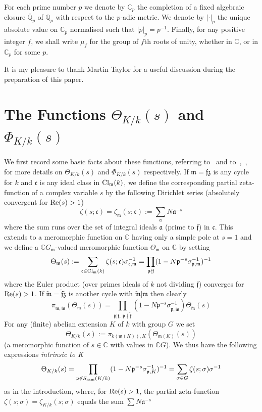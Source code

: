 \documentclass[12pt]{article}
\newcounter{rem}[section]%
\newcommand{\barbbQ}{\ensuremath{\bar{\bbQ}}}
\newcommand{\bbC}{\ensuremath{\mathbb{C}}}
\newcommand{\bbQ}{\ensuremath{\mathbb{Q}}}
\newcommand{\beql}[1]{\begin{equation}\label{#1}}
\newcommand{\Cl}{{\rm Cl}}
\newcommand{\eeq}{\end{equation}}
\newcommand{\fa}{\ensuremath{\mathfrak{a}}}
\newcommand{\fc}{\ensuremath{\mathfrak{c}}}
\newcommand{\ff}{\ensuremath{\mathfrak{f}}}
\newcommand{\fm}{\ensuremath{\mathfrak{m}}}
\newcommand{\fp}{\ensuremath{\mathfrak{p}}}
\newcommand{\fz}{\ensuremath{\mathfrak{z}}}
\newcommand{\inv}{^{-1}}%
\newcommand{\ndiv}{\nmid}
\newcommand{\nin}{\not\in}
\newcommand{\rem}{\refstepcounter{rem}\noindent{\sc Remark \therem}}%
\renewcommand{\therem}{\thesection.\arabic{rem}}
\newcommand{\Clmk}{\ensuremath{\Cl_\fm(k)}}
\newcommand{\tff}{\ensuremath{\tilde{\ff}}}
\newcommand{\tfm}{\ensuremath{{\tilde{\fm}}}}
\begin{document}
For each prime number $p$ we denote by
$\bbC_p$ the completion of a  fixed algebraic closure $\barbbQ_p$ of $\bbQ_p$
with respect to the $p$-adic metric. We denote by $|\cdot|_p$ the unique absolute value
on $\bbC_p$ normalised such that $|p|_p=p\inv$. Finally, for any positive integer
$f$, we shall write $\mu_f$ for the group of $f$th roots of unity, whether in $\bbC$, or in
$\bbC_p$ for some $p$.

It is my pleasure to thank Martin Taylor for a useful discussion during the
preparation of this paper.

\section{The Functions $\Theta_{K/k}(s)$ and $\Phi_{K/k}(s)$}\label{sec:thetaandphi}
We first record some basic facts about these functions, referring
to~\cite[Ch. IV]{Tate} and to~\cite{twizas},~\cite{zetap1},~\cite{sconzp}
for more details on $\Theta_{K/k}(s)$ and $\Phi_{K/k}(s)$ respectively.
If $\fm=\ff\fz$ is any cycle for $k$ and $\fc$ is any ideal class in $\Clmk$, we
define the corresponding partial zeta-function of a complex variable $s$
by the following Dirichlet series (absolutely convergent for ${\rm Re}(s)>1$)
\[
\zeta(s;\fc)=\zeta_\fm(s;\fc):=\sum_{\fa}N\fa^{-s}
\]
where the sum runs over the set of integral ideals $\fa$
(prime to $\ff$) in $\fc$.
This extends to a meromorphic function on $\bbC$ having only a
simple pole at $s=1$ and we define a $\bbC G_\fm$-valued meromorphic function
$\Theta_\fm$ on $\bbC$ by setting
\beql{eq:2Z}
\Theta_\fm(s):=\sum_{\fc\in\Clmk}\zeta(s;\fc)\sigma_{\fc,\fm}\inv=
\prod_{\fp\ndiv\ff}(1-N\fp^{-s}\sigma_{\fp,\fm}\inv)\inv
\eeq
where the Euler product (over primes ideals of $k$ not dividing $\ff$)
converges for ${\rm Re}(s)>1$.
If $\tilde{\fm}=\tilde{\ff}\tilde{\fz}$ is another cycle with $\tfm|\fm$ then clearly
\beql{eq:2A}
\pi_{\fm,\tfm}(\Theta_{\fm}(s))=
\prod_{\fp|\ff,\ \fp\ndiv\tff}
(1-N\fp^{-s}\sigma_{\fp,\tfm}\inv)\Theta_{\tfm}(s)
\eeq
For any (finite) abelian extension $K$ of $k$ with group $G$ we set
\beql{eq:2A.25}
\Theta_{K/k}(s):=\pi_{k(\fm(K)),K}(\Theta_{\fm(K)}(s))
\eeq
(a meromorphic function of $s\in\bbC$ with values in $\bbC G$). We thus
have the following expressions \emph{intrinsic to K}
\beql{eq:2A.5}
\Theta_{K/k}(s)=
\prod_{\fp\nin S_{\rm ram}(K/k)}(1-N\fp^{-s}\sigma_{\fp,K}\inv)\inv=
\sum_{\sigma\in G}\zeta(s;\sigma)\sigma\inv
\eeq
as in the introduction, where, for ${\rm Re}(s)>1$,
the partial zeta-function $\zeta(s;\sigma)=\zeta_{K/k}(s;\sigma)$
equals the sum $\sum N\fa^{-s}$
\end{document}
